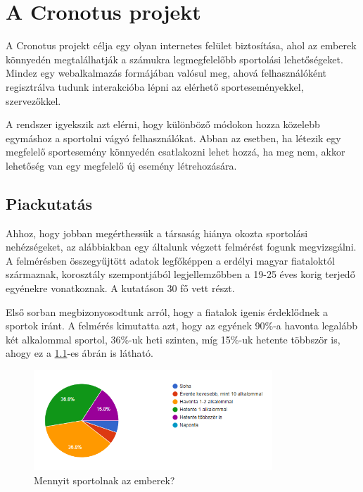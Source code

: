 \chapter{A Cronotus projekt}

  A Cronotus projekt célja egy olyan internetes felület biztosítása, ahol az emberek könnyedén megtalálhatják a számukra legmegfelelőbb 
  sportolási lehetőségeket. Mindez egy webalkalmazás formájában valósul meg, ahová felhasználóként regisztrálva tudunk interakcióba lépni
  az elérhető sporteseményekkel, szervezőkkel.

  A rendszer igyekszik azt elérni, hogy különböző módokon hozza közelebb egymáshoz a sportolni vágyó felhasználókat. Abban az esetben, ha 
  létezik egy megfelelő sportesemény könnyedén csatlakozni lehet hozzá, ha meg nem, akkor lehetőség van egy megfelelő új esemény létrehozására.

\section{Piackutatás}
  Ahhoz, hogy jobban megérthessük a társaság hiánya okozta sportolási nehézségeket, az alábbiakban egy általunk végzett felmérést fogunk megvizsgálni.
  A felmérésben összegyűjtött adatok legfőképpen a erdélyi magyar fiataloktól származnak, korosztály szempontjából legjellemzőbben a 
  19-25 éves korig terjedő egyénekre vonatkoznak. A kutatáson 30 fő vett részt.

  \newpage

  Első sorban megbizonyosodtunk arról, hogy a fiatalok igenis érdeklődnek a sportok iránt. A felmérés kimutatta azt, hogy az egyének 90\%-a
  havonta legalább két alkalommal sportol, 36\%-uk heti szinten, míg 15\%-uk hetente többször is, ahogy ez a \ref{fig:how_much_do_people_sport}-es ábrán is látható.

  \begin{figure}[ht]
    \centering
    \includegraphics[width=0.8\textwidth]{./images/Screenshot 2024-04-12 162623.png}
    \caption{Mennyit sportolnak az emberek?}
    \label{fig:how_much_do_people_sport}
  \end{figure}

